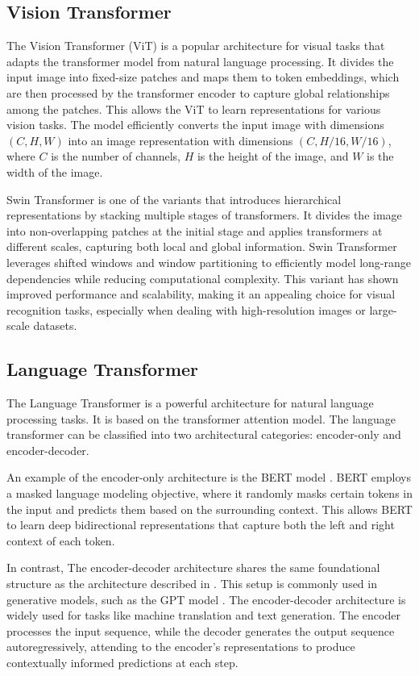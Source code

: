\subsection{Vision Transformer}
\label{vit}
The Vision Transformer (ViT) \cite{dosovitskiy2020vit} is a popular architecture for visual tasks that adapts the transformer model from natural language processing. It divides the input image into fixed-size patches and maps them to token embeddings, which are then processed by the transformer encoder to capture global relationships among the patches. This allows the ViT to learn representations for various vision tasks. The model efficiently converts the input image with dimensions $(C, H, W)$ into an image representation with dimensions $(C, H/16, W/16)$, where $C$ is the number of channels, $H$ is the height of the image, and $W$ is the width of the image.

Swin Transformer \cite{Liu_2021_ICCV} is one of the variants that introduces hierarchical representations by stacking multiple stages of transformers. It divides the image into non-overlapping patches at the initial stage and applies transformers at different scales, capturing both local and global information. Swin Transformer leverages shifted windows and window partitioning to efficiently model long-range dependencies while reducing computational complexity. This variant has shown improved performance and scalability, making it an appealing choice for visual recognition tasks, especially when dealing with high-resolution images or large-scale datasets.

\subsection{Language Transformer}
\label{language transformer}
The Language Transformer is a powerful architecture for natural language processing tasks. It is based on the transformer attention model. The language transformer can be classified into two architectural categories: encoder-only and encoder-decoder. 

An example of the encoder-only architecture is the BERT model \cite{devlin-etal-2019-bert}. BERT employs a masked language modeling objective, where it randomly masks certain tokens in the input and predicts them based on the surrounding context. This allows BERT to learn deep bidirectional representations that capture both the left and right context of each token.

In contrast, The encoder-decoder architecture shares the same foundational structure as the architecture described in \cite{vaswani2017attention}. This setup is commonly used in generative models, such as the GPT model \cite{brown2020language}. The encoder-decoder architecture is widely used for tasks like machine translation and text generation. The encoder processes the input sequence, while the decoder generates the output sequence autoregressively, attending to the encoder's representations to produce contextually informed predictions at each step.



